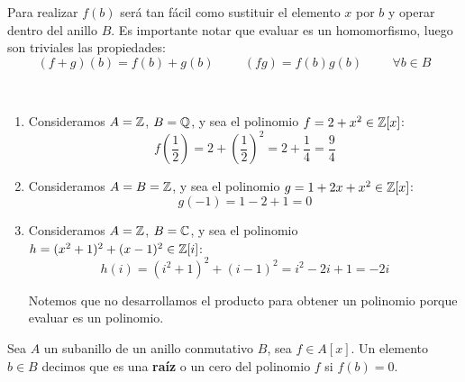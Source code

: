 Para realizar $f(b)$ será tan fácil como sustituir el elemento $x$ por $b$ y operar dentro del anillo $B$. Es importante notar que evaluar es un homomorfismo, luego son triviales las propiedades:
$$(f+g)(b) = f(b) + g(b) \hspace{1cm} (fg) = f(b)g(b) \hspace{1cm} \forall b \in B$$

\begin{ejemplo}\
\begin{enumerate}
    \item Consideramos $A=\mathbb Z$, $B=\mathbb Q$, y sea el polinomio $f=2+x^2 \in \mathbb Z[x]$:
    $$f\left(\dfrac{1}{2}\right) = 2 + \left(\dfrac{1}{2}\right)^2 = 2 + \dfrac{1}{4} = \dfrac{9}{4}$$

    \item Consideramos $A=B=\mathbb Z$, y sea el polinomio $g=1+2x+x^2 \in \mathbb Z[x]$:
    $$g(-1) = 1 - 2 + 1 = 0$$

    \item Consideramos $A=\mathbb Z$, $B=\mathbb C$, y sea el polinomio $h=(x^2+1)^2 + (x-1)^2 \in \mathbb Z[i]$:
    $$h(i) = (i^2 + 1)^2 + (i-1)^2 = i^2 - 2i + 1 = -2i$$

    Notemos que no desarrollamos el producto para obtener un polinomio porque evaluar es un polinomio.
\end{enumerate}
\end{ejemplo}

\begin{definicion}
    Sea $A$ un subanillo de un anillo conmutativo $B$, sea $f \in A[x]$. Un elemento $b \in B$ decimos que es una \textbf{raíz} o un cero del polinomio $f$ si $f(b) = 0$.
\end{definicion}

